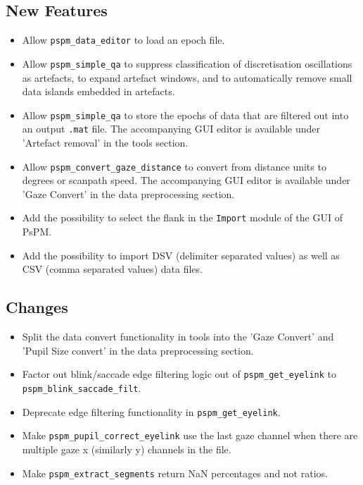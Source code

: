 \documentclass[english]{article}
\numberwithin{equation}{section}
\numberwithin{figure}{section}
\begin{document}
\subsection*{New Features}
\begin{itemize}
\item Allow \texttt{pspm\_data\_editor} to load an epoch file.
\item Allow \texttt{pspm\_simple\_qa} to suppress classification of discretisation 
			oscillations as artefacts, to expand artefact windows, and to automatically 
			remove small data islands embedded in artefacts.
\item Allow \texttt{pspm\_simple\_qa} to store the epochs of data that are
filtered out into an output \texttt{.mat} file. The accompanying GUI
editor is available under 'Artefact removal' in the tools section.
\item Allow \texttt{pspm\_convert\_gaze\_distance} to convert from distance
units to degrees or scanpath speed. The accompanying GUI editor is
available under 'Gaze Convert' in the data preprocessing section.
\item Add the possibility to select the flank in the \texttt{Import} module
of the GUI of PsPM.
\item Add the possibility to import DSV (delimiter separated values) as
well as CSV (comma separated values) data files.
\end{itemize}

\subsection*{Changes}
\begin{itemize}
\item Split the data convert functionality in tools into the 'Gaze Convert'
and 'Pupil Size convert' in the data preprocessing section.
\item Factor out blink/saccade edge filtering logic out of \texttt{pspm\_get\_eyelink}
to \texttt{pspm\_blink\_saccade\_filt}.
\item Deprecate edge filtering functionality in \texttt{pspm\_get\_eyelink}.
\item Make \texttt{pspm\_pupil\_correct\_eyelink} use the last gaze channel
when there are multiple gaze x (similarly y) channels in the file.
\item Make \texttt{pspm\_extract\_segments} return NaN percentages and not
ratios.
\end{itemize}
\end{document}
